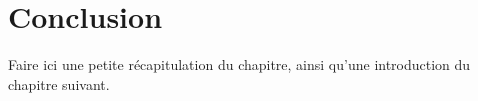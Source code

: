 \begin{spacing}{1.2}
\begin{itemize}
\end{itemize}
 
\section*{Conclusion}
Faire ici une petite récapitulation du chapitre, ainsi qu'une introduction du chapitre suivant.





\end{spacing}
